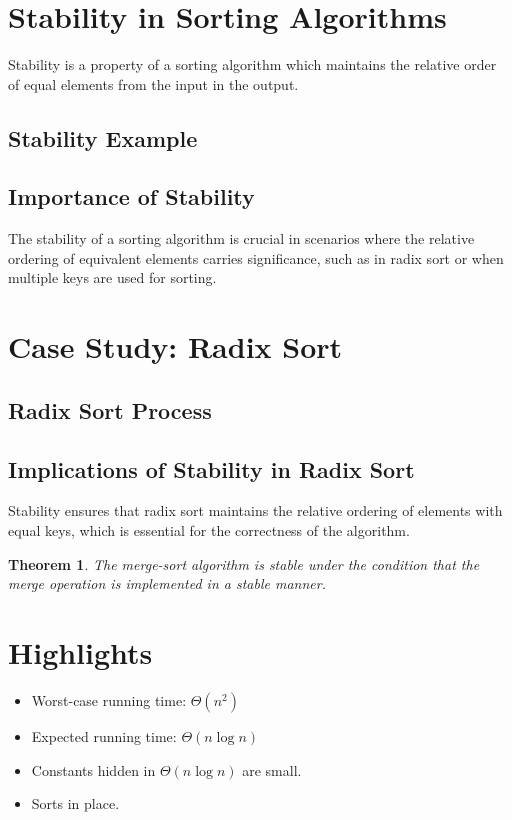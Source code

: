 \documentclass[12pt,openany]{book}
\newtheorem{theorem}{Theorem}[chapter]
\theoremstyle{definition}
\begin{document}
	\section{Stability in Sorting Algorithms}
	Stability is a property of a sorting algorithm which maintains the relative order of equal elements from the input in the output.
	
	\subsection{Stability Example}
	
	\subsection{Importance of Stability}
	The stability of a sorting algorithm is crucial in scenarios where the relative ordering of equivalent elements carries significance, such as in radix sort or when multiple keys are used for sorting.
	
	\section{Case Study: Radix Sort}
	\subsection{Radix Sort Process}
	
	\subsection{Implications of Stability in Radix Sort}
	Stability ensures that radix sort maintains the relative ordering of elements with equal keys, which is essential for the correctness of the algorithm.
	
	\begin{theorem}
		The merge-sort algorithm is stable under the condition that the merge operation is implemented in a stable manner.
	\end{theorem}

\section{Highlights}
\begin{itemize}
	\item Worst-case running time: \( \Theta(n^2) \)
	\item Expected running time: \( \Theta(n \log n) \)
	\item Constants hidden in \( \Theta(n \log n) \) are small.
	\item Sorts in place.
\end{itemize}
\end{document}
